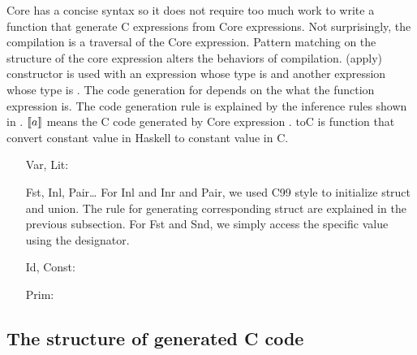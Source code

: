 Core has a concise syntax so it does not require too much work to write a function that generate C expressions from Core expressions. Not surprisingly, the compilation is a traversal of the Core expression. Pattern matching on the structure of the core expression alters the behaviors of compilation.  (apply) constructor is used with an expression whose type is  and another expression whose type is . The code generation for  depends on the what the function expression is. The code generation rule is explained by the inference rules shown in . $\llbracket a \rrbracket$ means the C code generated by Core expression . $\text{toC}$ is function that convert constant value in Haskell to constant value in C. 
\begin{itemize}
    \item[Var, Lit:]
    \item[Fst, Inl, Pair\dots] For Inl and Inr and Pair, we used C99 style to initialize struct and union. The rule for generating corresponding struct are explained in the previous subsection. For Fst and Snd, we simply access the specific value using the designator.
    \item[Id, Const:]
    \item[Prim:]
\end{itemize}

\subsection{The structure of generated C code}
